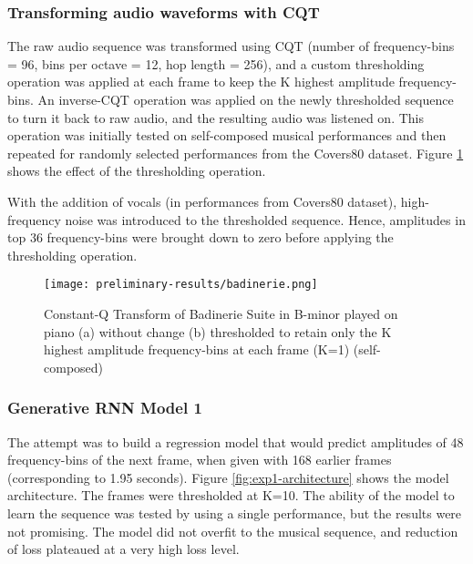 \documentclass[../main.tex]{subfiles}
\begin{document}
\subsubsection{Transforming audio waveforms with CQT}

\par
The raw audio sequence was transformed using \gls{CQT} (number of frequency-bins = 96, bins per octave = 12, hop length = 256), and a custom thresholding operation was applied at each frame to keep the K highest amplitude frequency-bins. An inverse-\gls{CQT} operation was applied on the newly thresholded sequence to turn it back to raw audio, and the resulting audio was listened on. This operation was initially tested on self-composed musical performances and then repeated for randomly selected performances from the Covers80 dataset. Figure \ref{fig:badinerie} shows the effect of the thresholding operation.

\par
With the addition of vocals (in performances from Covers80 dataset), high-frequency noise was introduced to the thresholded sequence. Hence, amplitudes in top 36 frequency-bins were brought down to zero before applying the thresholding operation.

\begin{figure}[H]
    \centering
    \texttt{[image: preliminary-results/badinerie.png]}
    \caption{Constant-Q Transform of Badinerie Suite in B-minor played on piano (a) without change (b) thresholded to retain only the K highest amplitude frequency-bins at each frame (K=1) (self-composed) }
    \label{fig:badinerie}
\end{figure}

\iffalse
\begin{figure}[H]
    \centering
    \texttt{[image: preliminary-results/c-major-scale.png]}
    \caption{Constant-Q Transform of ascending and descending the C-major scale, thresholded to retain only the highest K amplitude frequency-bins at each frame (K=1 here) }
    \label{fig:c-major-scale}
\end{figure}
\fi



\subsubsection{Generative RNN Model 1}

\par
The attempt was to build a regression model that would predict amplitudes of 48 frequency-bins of the next frame, when given with 168 earlier frames (corresponding to 1.95 seconds). Figure \ref{fig:exp1-architecture} shows the model architecture. The frames were thresholded at K=10. The ability of the model to learn the sequence was tested by using a single performance, but the results were not promising. The model did not overfit to the musical sequence, and reduction of loss plateaued at a very high loss level.
\end{document}
